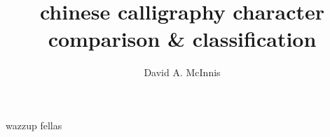 \documentclass{ewuthesis}
\begin{document}
    \title{chinese calligraphy character comparison & classification}
    \author{David A. McInnis}    
    \frontmatter
    \maketitle          %
    \makesigpage        %
    \mainmatter



wazzup\cite{Gao:2012:CDC:2232817.2232889} fellas



    
    
    
\end{document}
